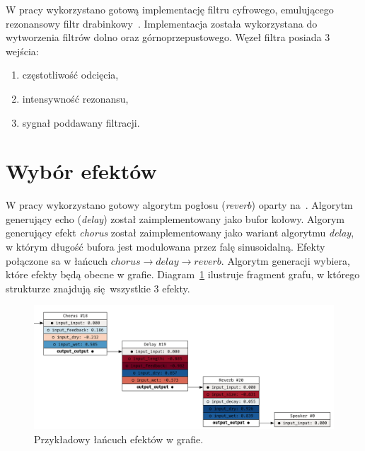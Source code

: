 W pracy wykorzystano gotową implementację filtru cyfrowego, emulującego
rezonansowy filtr drabinkowy~\cite{ladder_filter_rust}. Implementacja została
wykorzystana do wytworzenia filtrów dolno oraz górnoprzepustowego.
Węzeł filtra posiada 3 wejścia:

\begin{enumerate}
  \item częstotliwość odcięcia,
  \item intensywność rezonansu,
  \item sygnał poddawany filtracji.
\end{enumerate}



\section{Wybór efektów}

W pracy wykorzystano gotowy algorytm pogłosu (\textit{reverb}) oparty na~\cite{reverb}.
Algorytm generujący echo (\textit{delay}) został zaimplementowany jako bufor kołowy.
Algorym generujący efekt \textit{chorus} został zaimplementowany jako wariant algorytmu \textit{delay},
w którym długość bufora jest modulowana przez falę sinusoidalną. Efekty połączone sa w łańcuch
$chorus \rightarrow delay \rightarrow reverb$. Algorytm generacji wybiera, które efekty będą obecne w grafie.
Diagram~\ref{fig:example_generated_effects} ilustruje fragment grafu,
w którego strukturze znajdują się wszystkie 3 efekty.

\begin{figure}[H]
    \centering
    \includegraphics[width=1.0\linewidth]{rys06/example_generated_effects.png}
    \caption{
      Przykładowy łańcuch efektów w grafie.
    }\label{fig:example_generated_effects}
\end{figure}
